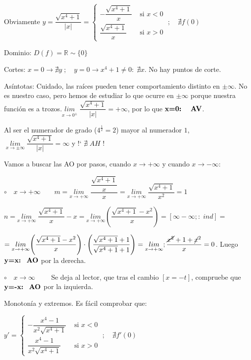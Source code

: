 \begin{proofw}\renewcommand{\qedsymbol}{$\diamond$}	

Obviamente $y=\dfrac {\sqrt{x^4+1}}{|x|}=\begin{cases}
			-\dfrac {\sqrt{x^4+1}}{x} & \mbox{ si } x<0 \\
			\dfrac {\sqrt{x^4+1}}{x} & \mbox{ si } x>0
			\end{cases}\; ; \quad \nexists f(0)$
			
Dominio: $D(f)=\mathbb R \sim \{0\}$

Cortes: $x=0 \to \nexists y\; ; \quad y=0 \to x^4+1\neq 0: \; \nexists x$. No hay puntos de corte.

Asíntotas: Cuidado, las raíces pueden tener comportamiento distinto en $\pm \infty$. No es nuestro caso, pero hemos de estudiar lo que ocurre en $\pm \infty$ porque nuestra función es a trozos.$\underset {x\to 0^{\pm}}{lim}\;{ \dfrac {\sqrt{x^4+1}}{|x|} }= +\infty$, por lo que $\textbf{x=0: \; AV}$.

Al ser el numerador de grado ($4^{\frac 1 2}=2$) mayor al numerador $1$, $\; \underset{x\to \pm \infty}{lim}\; {\dfrac {\sqrt{x^4+1}}{|x|}}=\infty $ y !` $\nexists  \; AH $ !

Vamos a buscar las AO por pasos, cuando $x\to +\infty$ y cuando   $x\to -\infty$:


$\circ \quad x\to +\infty \qquad m=\underset{x\to +\infty}{lim }\;{ \dfrac { \dfrac {\sqrt{x^4+1}} {x} } {x}}= \underset{x\to +\infty}{lim }\;{ \dfrac {\sqrt{x^4+1}}{x^2} }=1$

$n=\underset {x\to +\infty}{lim }\;{ \dfrac {\sqrt{x^4+1}}{x} - x }  = \underset {x\to +\infty}{lim }{ \left(  \dfrac {\sqrt{x^4+1}-x^2}{x} \right)}=[\infty - \infty;:\; ind]=$

$=\underset {x\to +\infty}{lim }{ \left(  \dfrac {\sqrt{x^4+1}-x^2}{x} \right)  \cdot \left(  \dfrac {\sqrt{x^4+1} +1 }{\sqrt{x^4+1} +1}   \right) }= \underset {x\to +\infty}{lim };{ \dfrac {\cancel{x^2}+1+\cancel{x}^2}{x}}=0$. Luego $\textbf{y=x:\; AO}$ por la derecha.

$\circ \quad x\to \infty \qquad$ Se deja al lector, que tras el cambio $[x=-t]$, compruebe que $\textbf{y=-x:\; AO}$ por la izquierda.

Monotonía y extremos. Es fácil comprobar que:

$y'=\begin{cases}
			-\dfrac{x^4-1}{x^2 \sqrt{x^4+1}} & \mbox{ si } x<0 \\
		\dfrac{x^4-1}{x^2 \sqrt{x^4+1}} & \mbox{ si } x>0
			\end{cases}\; ; \quad \nexists f'(0)$


\end{proofw}
